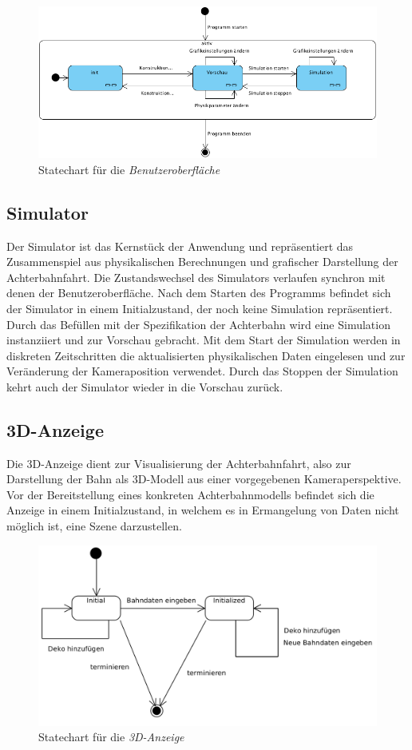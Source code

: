 \begin{figure}
\includegraphics[width=\linewidth]{bilder/StateChart_GUI}
\caption{Statechart für die \textit{Benutzeroberfläche}}
\end{figure}

\subsection{Simulator}
Der Simulator ist das Kernstück der Anwendung und repräsentiert das Zusammenspiel aus physikalischen Berechnungen
und grafischer Darstellung der Achterbahnfahrt. Die Zustandswechsel des Simulators verlaufen synchron mit 
denen der Benutzeroberfläche. Nach dem Starten des Programms befindet sich der Simulator in einem Initialzustand,
der noch keine Simulation repräsentiert. Durch das Befüllen mit der Spezifikation der Achterbahn wird
eine Simulation instanziiert und zur Vorschau gebracht. Mit dem Start der Simulation werden in diskreten Zeitschritten
die aktualisierten physikalischen Daten eingelesen und zur Veränderung der Kameraposition verwendet. Durch das
Stoppen der Simulation kehrt auch der Simulator wieder in die Vorschau zurück.

\subsection{3D-Anzeige}
Die 3D-Anzeige dient zur Visualisierung der Achterbahnfahrt, also zur Darstellung der Bahn als 3D-Modell aus
einer vorgegebenen Kameraperspektive. Vor der Bereitstellung eines konkreten Achterbahnmodells befindet sich
die Anzeige in einem Initialzustand, in welchem es in Ermangelung von Daten nicht möglich ist, eine Szene darzustellen. 

\begin{figure}
\includegraphics[width=\linewidth]{bilder/statechart_3dgraphics}
\caption{Statechart für die \textit{3D-Anzeige}}
\end{figure}

